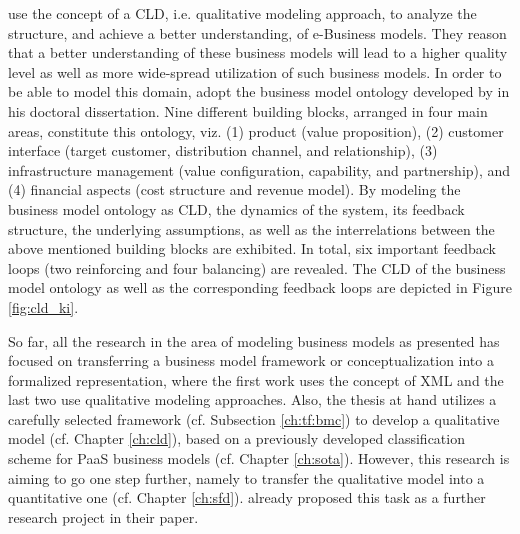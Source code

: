 \citet{Kiani2009} use the concept of a \ac{CLD}, i.e. qualitative modeling approach, to analyze the structure, and achieve a better understanding, of e-Business models. They reason that a better understanding of these business models will lead to a higher quality level as well as more wide-spread utilization of such business models. In order to be able to model this domain, \citet{Kiani2009} adopt the business model ontology developed by \citet{Osterwalder2004} in his doctoral dissertation. Nine different building blocks, arranged in four main areas, constitute this ontology, viz. (1) product (value proposition), (2) customer interface (target customer, distribution channel, and relationship), (3) infrastructure management (value configuration, capability, and partnership), and (4) financial aspects (cost structure and revenue model). By modeling the business model ontology as \ac{CLD}, the dynamics of the system, its feedback structure, the underlying assumptions, as well as the interrelations between the above mentioned building blocks are exhibited. In total, six important feedback loops (two reinforcing and four balancing) are revealed. The \ac{CLD} of the business model ontology as well as the corresponding feedback loops are depicted in Figure \ref{fig:cld_ki}.

So far, all the research in the area of modeling business models as presented has focused on transferring a business model framework or conceptualization into a formalized representation, where the first work uses the concept of \ac{XML} and the last two use qualitative modeling approaches. Also, the thesis at hand utilizes a carefully selected framework (cf. Subsection \ref{ch:tf:bmc}) to develop a qualitative model (cf. Chapter \ref{ch:cld}), based on a previously developed classification scheme for \ac{PaaS} business models (cf. Chapter \ref{ch:sota}). However, this research is aiming to go one step further, namely to transfer the qualitative model into a quantitative one (cf. Chapter \ref{ch:sfd}). \citet{Kiani2009} already proposed this task as a further research project in their paper.
